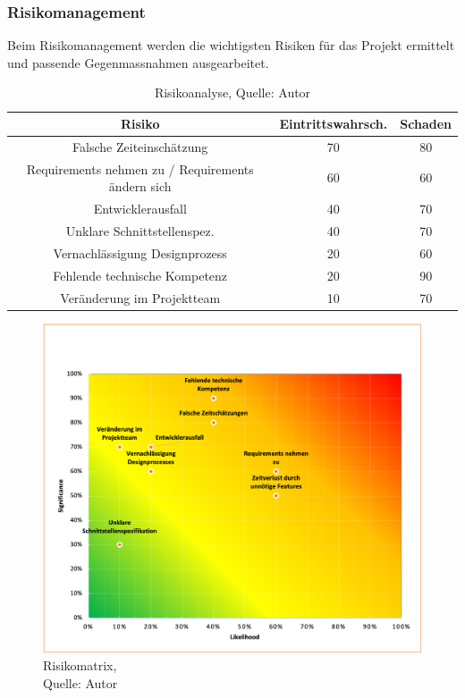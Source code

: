 \subsubsection{Risikomanagement}\label{risikomanagement}
Beim Risikomanagement werden die wichtigsten Risiken für das Projekt ermittelt und passende Gegenmassnahmen ausgearbeitet. 

\begin{table}[H]
\setlength\extrarowheight{2pt} %
\begin{tabularx}{\textwidth}{|C|C|C|}
\hline
\textbf{Risiko} & \textbf{Eintrittswahrsch.} & \textbf{Schaden} \\

\hline
Falsche Zeiteinschätzung &  70 & 80\\
\hline
Requirements nehmen zu / Requirements ändern sich & 60 & 60\\
\hline
Entwicklerausfall & 40 & 70\\
\hline
Unklare Schnittstellenspez. & 40 & 70\\
\hline
Vernachlässigung Designprozess & 20 & 60\\
\hline
Fehlende technische Kompetenz & 20 & 90\\
\hline
Veränderung im Projektteam & 10 & 70\\
\hline
\end{tabularx}
\caption{ \label{tbl: Risikoanalyse}Risikoanalyse, Quelle: Autor}
\end{table}
\begin{figure}[H]
    \centering
    \includegraphics[width=1\textwidth]{images/RiskMap.png}
    \caption[Risikomatrix]{Risikomatrix,\\ Quelle: Autor}
    \label{img: Risikomatrix}
\end{figure}

